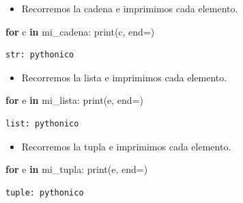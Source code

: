 \documentclass[
  spanish,
  letterpaper,
]{scrbook}
\newenvironment{Shaded}{\begin{snugshade}}{\end{snugshade}}
\newcommand{\BuiltInTok}[1]{\textcolor[rgb]{0.00,0.23,0.31}{#1}}
\newcommand{\ControlFlowTok}[1]{\textcolor[rgb]{0.00,0.23,0.31}{\textbf{#1}}}
\newcommand{\KeywordTok}[1]{\textcolor[rgb]{0.00,0.23,0.31}{\textbf{#1}}}
\newcommand{\NormalTok}[1]{\textcolor[rgb]{0.00,0.23,0.31}{#1}}
\newcommand{\OperatorTok}[1]{\textcolor[rgb]{0.37,0.37,0.37}{#1}}
\newcommand{\StringTok}[1]{\textcolor[rgb]{0.13,0.47,0.30}{#1}}
\providecommand{\tightlist}{%
  \setlength{\itemsep}{0pt}\setlength{\parskip}{0pt}}
\theoremstyle{definition}
\theoremstyle{remark}
\begin{document}
\begin{itemize}
\tightlist
\item
  Recorremos la cadena e imprimimos cada elemento.
\end{itemize}

\begin{Shaded}
\begin{Highlighting}[]
\ControlFlowTok{for}\NormalTok{ c }\KeywordTok{in}\NormalTok{ mi\_cadena:}
    \BuiltInTok{print}\NormalTok{(c, end}\OperatorTok{=}\StringTok{\textquotesingle{}\textquotesingle{}}\NormalTok{)}
\end{Highlighting}
\end{Shaded}

\begin{verbatim}
str: pythonico
\end{verbatim}

\begin{itemize}
\tightlist
\item
  Recorremos la lista e imprimimos cada elemento.
\end{itemize}

\begin{Shaded}
\begin{Highlighting}[]
\ControlFlowTok{for}\NormalTok{ e }\KeywordTok{in}\NormalTok{ mi\_lista:}
    \BuiltInTok{print}\NormalTok{(e, end}\OperatorTok{=}\StringTok{\textquotesingle{}\textquotesingle{}}\NormalTok{)}
\end{Highlighting}
\end{Shaded}

\begin{verbatim}
list: pythonico
\end{verbatim}

\begin{itemize}
\tightlist
\item
  Recorremos la tupla e imprimimos cada elemento.
\end{itemize}

\begin{Shaded}
\begin{Highlighting}[]
\ControlFlowTok{for}\NormalTok{ e }\KeywordTok{in}\NormalTok{ mi\_tupla:}
    \BuiltInTok{print}\NormalTok{(e, end}\OperatorTok{=}\StringTok{\textquotesingle{}\textquotesingle{}}\NormalTok{)}
\end{Highlighting}
\end{Shaded}

\begin{verbatim}
tuple: pythonico
\end{verbatim}
\end{document}
